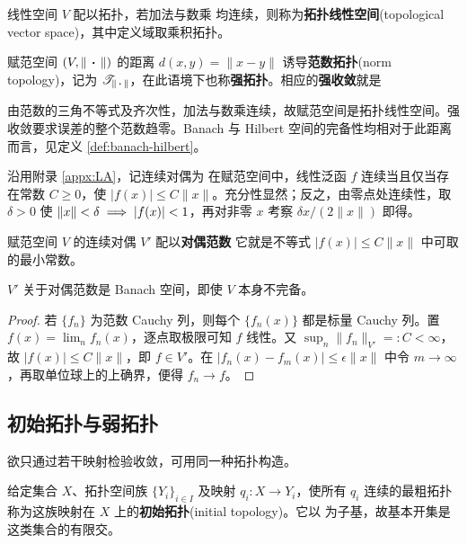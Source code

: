 \begin{definition}
    线性空间 $V$ 配以拓扑，若加法与数乘
    均连续，则称为\textbf{拓扑线性空间}(topological vector space)，其中定义域取乘积拓扑。
\end{definition}

\begin{definition}
    赋范空间 $(V,\|\oo\|)$ 的距离 $d(x,y)=\|x-y\|$ 诱导\textbf{范数拓扑}(norm topology)，记为 $\topo T_{\|\oo\|}$，在此语境下也称\textbf{强拓扑}。相应的\textbf{强收敛}就是
\end{definition}

由范数的三角不等式及齐次性，加法与数乘连续，故赋范空间是拓扑线性空间。强收敛要求误差的整个范数趋零。Banach 与 Hilbert 空间的完备性均相对于此距离而言，见定义 \ref{def:banach-hilbert}。

沿用附录 \ref{appx:LA}，记连续对偶为
在赋范空间中，线性泛函 $f$ 连续当且仅当存在常数 $C\geqslant0$，使 $|f(x)|\leqslant C\|x\|$。充分性显然；反之，由零点处连续性，取 $\delta>0$ 使 $\|x\|<\delta\implies|f(x)|<1$，再对非零 $x$ 考察 $\delta x/(2\|x\|)$ 即得。

\begin{definition}
    赋范空间 $V$ 的连续对偶 $V'$ 配以\textbf{对偶范数}
    它就是不等式 $|f(x)|\leqslant C\|x\|$ 中可取的最小常数。
\end{definition}

\begin{theorem}
    $V'$ 关于对偶范数是 Banach 空间，即使 $V$ 本身不完备。
\end{theorem}
\begin{proof}
    若 $\{f_n\}$ 为范数 Cauchy 列，则每个 $\{f_n(x)\}$ 都是标量 Cauchy 列。置 $f(x)=\lim_n f_n(x)$，逐点取极限可知 $f$ 线性。又 $\sup_n\|f_n\|_{V'}=:C<\infty$，故 $|f(x)|\leqslant C\|x\|$，即 $f\in V'$。在 $|f_n(x)-f_m(x)|\leqslant\epsilon\|x\|$ 中令 $m\to\infty$，再取单位球上的上确界，便得 $f_n\to f$。
\end{proof}

\subsection{初始拓扑与弱拓扑}

欲只通过若干映射检验收敛，可用同一种拓扑构造。

\begin{definition}\label{def:initial-topology}
    给定集合 $X$、拓扑空间族 $\{Y_i\}_{i\in I}$ 及映射 $q_i:X\to Y_i$，使所有 $q_i$ 连续的最粗拓扑称为这族映射在 $X$ 上的\textbf{初始拓扑}(initial topology)。它以
    为子基，故基本开集是这类集合的有限交。
\end{definition}

